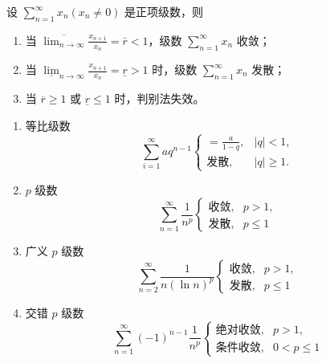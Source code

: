 \documentclass{ctexbook}
\begin{document}
\begin{theorem}
    设 $\sum_{n=1}^\infty x_n(x_n\neq 0)$ 是正项级数，则
    \begin{enumerate}
        \item 当 $\overline{\lim_{n\rightarrow\infty}}\frac{x_{n+1}}{x_n}=\bar{r}<1$，级数 $\sum_{n=1}^\infty x_n$ 收敛；
        \item 当 ${\underline{\lim}}_{n\rightarrow\infty}\frac{x_{n+1}}{x_n}=\underline{r}>1$ 时，级数 $\sum_{n=1}^\infty x_n$ 发散；
        \item 当 $\overline{r}\geq 1$ 或 $\underline{r}\leq 1$ 时，判别法失效。
    \end{enumerate}
\end{theorem}

\begin{proposition}[常见无穷级数尺度]
    \begin{enumerate}
        \item 等比级数 \begin{equation}\sum_{i=1}^\infty aq^{n-1}\begin{cases}
            =\frac{a}{1-q}, & |q|<1, \\
            \text{发散}, & |q|\geq 1.
        \end{cases}\end{equation}
        \item $p$ 级数 \begin{equation}\sum_{n=1}^\infty \frac{1}{n^p}\begin{cases}
            \text{收敛}, & p>1, \\
            \text{发散}, & p\leq 1
        \end{cases}\end{equation}
        \item 广义 $p$ 级数 \begin{equation}\sum_{n=2}^\infty\frac{1}{n(\ln n)^p}\begin{cases}
            \text{收敛}, & p>1, \\
            \text{发散}, & p\leq 1
        \end{cases}\end{equation}
        \item 交错 $p$ 级数 \begin{equation}\sum_{n=1}^\infty (-1)^{n-1}\frac{1}{n^p}\begin{cases}
            \text{绝对收敛}, & p>1, \\
            \text{条件收敛}, & 0<p\leq 1
        \end{cases}\end{equation}
    \end{enumerate}
\end{proposition}
\end{document}
